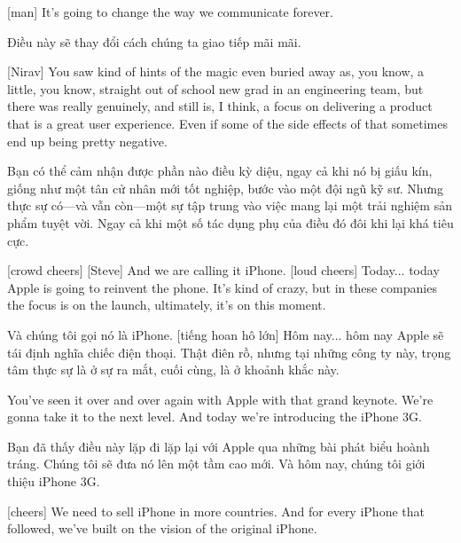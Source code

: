 \documentclass[a4paper]{article}
\begin{document}
	[man] It's going to change the way we communicate forever.
	
	\begin{vietnamese-v2}
		 Điều này sẽ thay đổi cách chúng ta giao tiếp mãi mãi.
	\end{vietnamese-v2}
	
	[Nirav] You saw kind of hints of the magic even buried away as, you know, a little, you know, straight out of school new grad in an engineering team, but there was really genuinely, and still is, I think, a focus on delivering a product that is a great user experience.
	Even if some of the side effects of that sometimes end up being pretty negative.
	
	\begin{vietnamese-v2}
		[Nirav] Bạn có thể cảm nhận được phần nào điều kỳ diệu, ngay cả khi nó bị giấu kín, giống như một tân cử nhân mới tốt nghiệp, bước vào một đội ngũ kỹ sư. Nhưng thực sự có—và vẫn còn—một sự tập trung vào việc mang lại một trải nghiệm sản phẩm tuyệt vời. Ngay cả khi một số tác dụng phụ của điều đó đôi khi lại khá tiêu cực.
	\end{vietnamese-v2}
	
	
	[crowd cheers]
	[Steve] And we are calling it iPhone.
	[loud cheers]
	Today...
	today Apple is going to reinvent the phone.
	It's kind of crazy, but in these companies the focus is on the launch, ultimately, it's on this moment.
	
	\begin{vietnamese-v2}
		 Và chúng tôi gọi nó là iPhone.  
		[tiếng hoan hô lớn]  
		Hôm nay...  
		hôm nay Apple sẽ tái định nghĩa chiếc điện thoại.  
		Thật điên rồ, nhưng tại những công ty này, trọng tâm thực sự là ở sự ra mắt, cuối cùng, là ở khoảnh khắc này.
	\end{vietnamese-v2}
	
	You've seen it over and over again with Apple with that grand keynote.
	We're gonna take it to the next level.
	And today we're introducing the iPhone 3G.
	
	\begin{vietnamese-v2}
		Bạn đã thấy điều này lặp đi lặp lại với Apple qua những bài phát biểu hoành tráng.  
		Chúng tôi sẽ đưa nó lên một tầm cao mới.  
		Và hôm nay, chúng tôi giới thiệu iPhone 3G.
	\end{vietnamese-v2}

	[cheers]
	We need to sell iPhone in more countries. And for every iPhone that followed, we've built on the vision of the original iPhone.
	
\end{document}
